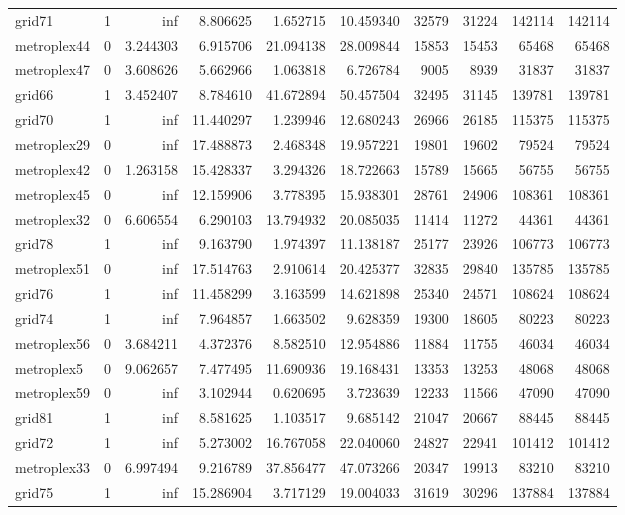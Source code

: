 \begin{longtable}{|l|r|r|r|r|r|r|r|r|r|}
grid71 & 1 & inf & 8.806625 & 1.652715 & 10.459340 & 32579 & 31224 & 142114 & 142114 \\
metroplex44 & 0 & 3.244303 & 6.915706 & 21.094138 & 28.009844 & 15853 & 15453 & 65468 & 65468 \\
metroplex47 & 0 & 3.608626 & 5.662966 & 1.063818 & 6.726784 & 9005 & 8939 & 31837 & 31837 \\
grid66 & 1 & 3.452407 & 8.784610 & 41.672894 & 50.457504 & 32495 & 31145 & 139781 & 139781 \\
grid70 & 1 & inf & 11.440297 & 1.239946 & 12.680243 & 26966 & 26185 & 115375 & 115375 \\
metroplex29 & 0 & inf & 17.488873 & 2.468348 & 19.957221 & 19801 & 19602 & 79524 & 79524 \\
metroplex42 & 0 & 1.263158 & 15.428337 & 3.294326 & 18.722663 & 15789 & 15665 & 56755 & 56755 \\
metroplex45 & 0 & inf & 12.159906 & 3.778395 & 15.938301 & 28761 & 24906 & 108361 & 108361 \\
metroplex32 & 0 & 6.606554 & 6.290103 & 13.794932 & 20.085035 & 11414 & 11272 & 44361 & 44361 \\
grid78 & 1 & inf & 9.163790 & 1.974397 & 11.138187 & 25177 & 23926 & 106773 & 106773 \\
metroplex51 & 0 & inf & 17.514763 & 2.910614 & 20.425377 & 32835 & 29840 & 135785 & 135785 \\
grid76 & 1 & inf & 11.458299 & 3.163599 & 14.621898 & 25340 & 24571 & 108624 & 108624 \\
grid74 & 1 & inf & 7.964857 & 1.663502 & 9.628359 & 19300 & 18605 & 80223 & 80223 \\
metroplex56 & 0 & 3.684211 & 4.372376 & 8.582510 & 12.954886 & 11884 & 11755 & 46034 & 46034 \\
metroplex5 & 0 & 9.062657 & 7.477495 & 11.690936 & 19.168431 & 13353 & 13253 & 48068 & 48068 \\
metroplex59 & 0 & inf & 3.102944 & 0.620695 & 3.723639 & 12233 & 11566 & 47090 & 47090 \\
grid81 & 1 & inf & 8.581625 & 1.103517 & 9.685142 & 21047 & 20667 & 88445 & 88445 \\
grid72 & 1 & inf & 5.273002 & 16.767058 & 22.040060 & 24827 & 22941 & 101412 & 101412 \\
metroplex33 & 0 & 6.997494 & 9.216789 & 37.856477 & 47.073266 & 20347 & 19913 & 83210 & 83210 \\
grid75 & 1 & inf & 15.286904 & 3.717129 & 19.004033 & 31619 & 30296 & 137884 & 137884 \\

\end{longtable}
